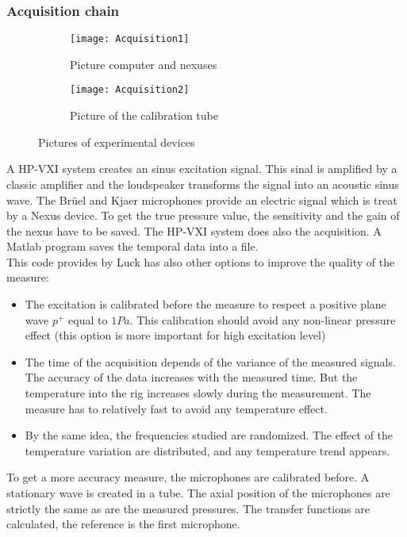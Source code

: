 \subsubsection{Acquisition chain}
\begin{figure}[H] \centering
    \begin{subfigure}{.5\textwidth}\centering
     \texttt{[image: Acquisition1]}
     \caption{Picture computer and nexuses}
    \end{subfigure}%
    \begin{subfigure}{.5\textwidth}\centering
     \texttt{[image: Acquisition2]}  
      \caption{Picture of the  calibration tube}
    \end{subfigure}
    \caption{Pictures of experimental devices}
\end{figure}
\noindent A HP-VXI system creates an sinus excitation signal. This sinal is amplified by a classic amplifier and the loudspeaker transforms the signal into an acoustic sinus wave. The Brüel and Kjaer microphones provide an electric signal which is treat by a Nexus device. To get the true pressure value, the sensitivity and the gain of the nexus have to be saved. The HP-VXI system does also the acquisition. A Matlab program saves the temporal data into a file.\\
This code provides by Luck \cite{Luck_thesis} has also other options to improve the quality of the measure:
\begin{itemize}
    \item The excitation is calibrated before the measure to respect a positive plane wave $p^+$ equal to $1Pa$. This calibration should avoid any non-linear pressure effect (this option is more important for high excitation level)
    \item The time of the acquisition depends of the variance of the measured signals. The accuracy of the data increases with the measured time. But the temperature into the rig increases slowly during the measurement. The measure has to relatively fast to avoid any temperature effect.
    \item By the same idea, the frequencies studied are randomized. The effect of the temperature variation are distributed, and any temperature trend appears.
\end{itemize}
To get a more accuracy measure, the microphones are calibrated before. A stationary wave is created in a tube. The axial position of the microphones are strictly the same as are the measured pressures. The transfer functions are calculated, the reference is the first microphone.
